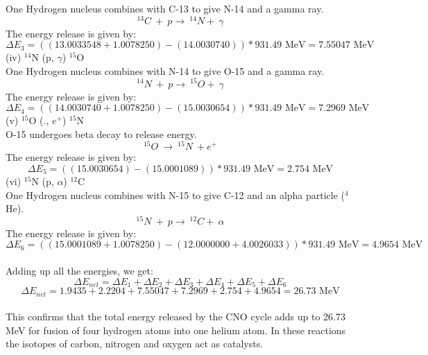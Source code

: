\documentclass[10pt]{article}
\begin{document}
One Hydrogen nucleus combines with C-13 to give N-14 and a gamma ray.\\
\[ ^{\text{13}}C  \ +  \ p \longrightarrow  \ ^{\text{14}}N + \ \gamma \]
The energy release is given by:
\[ \Delta E_{3} = ((13.0033548 + 1.0078250) - (14.0030740))*931.49 \text{ MeV}  = 7.55047 \text{ MeV} \]
(iv) $^{\text{14}}$N (p, $\gamma$) $^{\text{15}}$O \\
One Hydrogen nucleus combines with N-14 to give O-15 and a gamma ray.\\
\[ ^{\text{14}}N  \ +  \ p \longrightarrow  \ ^{\text{15}}O + \ \gamma \]
The energy release is given by:
\[ \Delta E_{4} = ((14.0030740 + 1.0078250) - (15.0030654))*931.49 \text{ MeV}  = 7.2969 \text{ MeV} \]
(v) $^{\text{15}}$O (., $e^{+}$) $^{\text{15}}$N \\
O-15 undergoes beta decay to release energy.\\
\[ ^{\text{15}}O  \ \longrightarrow  \ ^{\text{15}}N \  + e^{+} \]
The energy release is given by:
\[ \Delta E_{5} = ((15.0030654) - (15.0001089))*931.49 \text{ MeV}  = 2.754 \text{ MeV} \]
(vi) $^{\text{15}}$N (p, $\alpha$) $^{\text{12}}$C\\ 
One Hydrogen nucleus combines with N-15 to give C-12 and an alpha particle ($^{\text{4}}$He).\\
\[ ^{\text{15}}N  \ +  \ p \longrightarrow  \ ^{\text{12}}C + \ \alpha \]
The energy release is given by:
\[ \Delta E_{6} = ((15.0001089 + 1.0078250) - (12.0000000 + 4.0026033 ))*931.49 \text{ MeV}  = 4.9654 \text{ MeV} \] \\
Adding up all the energies, we get:
\[ \Delta E_{net} = \Delta E_{1} + \Delta E_{2} + \Delta E_{3} + \Delta E_{4} + \Delta E_{5} + \Delta E_{6}\]
\[ \Delta E_{net} = 1.9435 + 2.2204 + 7.55047 + 7.2969 + 2.754 + 4.9654 = 26.73 \text{ MeV} \] \\
This confirms that the total energy released by the CNO cycle adds up to 26.73 MeV for fusion of four hydrogen atoms into one helium atom. In these reactions the isotopes of carbon, nitrogen and oxygen act as catalysts.
\end{document}
